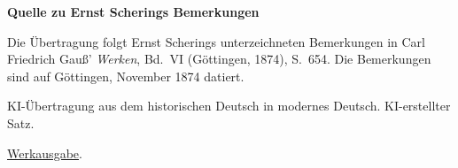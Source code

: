 \clearpage\thispagestyle{empty}
\begin{center}\Large\bfseries Quelle zu Ernst Scherings Bemerkungen\end{center}

Die Übertragung folgt Ernst Scherings unterzeichneten Bemerkungen in Carl Friedrich Gauß’ \emph{Werken}, Bd.~VI (Göttingen, 1874), S.~654. Die Bemerkungen sind auf Göttingen, November 1874 datiert.

KI-Übertragung aus dem historischen Deutsch in modernes Deutsch. KI-erstellter Satz.

\href{https://gdz.sub.uni-goettingen.de/id/PPN236007467}{Werkausgabe}.

\clearpage
